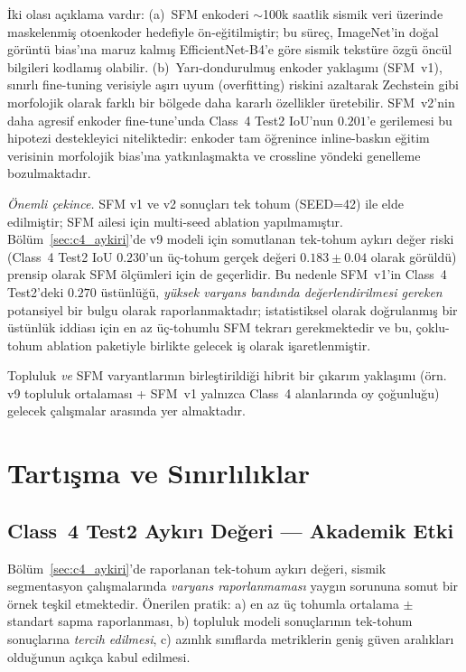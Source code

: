 \documentclass[conference,a4paper,10pt]{IEEEtran}
\begin{document}
İki olası açıklama vardır: (a)~SFM enkoderi $\sim$100k saatlik sismik
veri üzerinde maskelenmiş otoenkoder hedefiyle ön-eğitilmiştir; bu süreç,
ImageNet'in doğal görüntü bias'ına maruz kalmış EfficientNet-B4'e göre
sismik tekstüre özgü öncül bilgileri kodlamış olabilir. (b)~Yarı-dondurulmuş
enkoder yaklaşımı (SFM~v1), sınırlı fine-tuning verisiyle aşırı uyum
(overfitting) riskini azaltarak Zechstein gibi morfolojik olarak farklı
bir bölgede daha kararlı özellikler üretebilir. SFM~v2'nin daha agresif
enkoder fine-tune'unda Class~4 Test2 IoU'nun $0.201$'e gerilemesi bu
hipotezi destekleyici niteliktedir: enkoder tam öğrenince inline-baskın
eğitim verisinin morfolojik bias'ına yatkınlaşmakta ve crossline yöndeki
genelleme bozulmaktadır.

\textit{Önemli çekince.} SFM v1 ve v2 sonuçları tek tohum (SEED=42) ile
elde edilmiştir; SFM ailesi için multi-seed ablation yapılmamıştır.
Bölüm~\ref{sec:c4_aykiri}'de v9 modeli için somutlanan tek-tohum aykırı
değer riski (Class~4 Test2 IoU $0.230$'un üç-tohum gerçek değeri
$0.183 \pm 0.04$ olarak görüldü) prensip olarak SFM ölçümleri için de
geçerlidir. Bu nedenle SFM~v1'in Class~4 Test2'deki $0.270$ üstünlüğü,
\emph{yüksek varyans bandında değerlendirilmesi gereken} potansiyel bir
bulgu olarak raporlanmaktadır; istatistiksel olarak doğrulanmış bir
üstünlük iddiası için en az üç-tohumlu SFM tekrarı gerekmektedir ve
bu, çoklu-tohum ablation paketiyle birlikte gelecek iş olarak
işaretlenmiştir.

Topluluk \emph{ve} SFM varyantlarının birleştirildiği hibrit bir çıkarım
yaklaşımı (örn. v9 topluluk ortalaması + SFM~v1 yalnızca Class~4 alanlarında
oy çoğunluğu) gelecek çalışmalar arasında yer almaktadır.

\section{Tartışma ve Sınırlılıklar}
\label{sec:tartisma}

\subsection{Class~4 Test2 Aykırı Değeri --- Akademik Etki}

Bölüm~\ref{sec:c4_aykiri}'de raporlanan tek-tohum aykırı değeri, sismik
segmentasyon çalışmalarında \emph{varyans raporlanmaması} yaygın sorununa
somut bir örnek teşkil etmektedir. Önerilen pratik: a) en az üç tohumla
ortalama $\pm$ standart sapma raporlanması, b) topluluk modeli sonuçlarının
tek-tohum sonuçlarına \emph{tercih edilmesi}, c) azınlık sınıflarda
metriklerin geniş güven aralıkları olduğunun açıkça kabul edilmesi.
\end{document}
